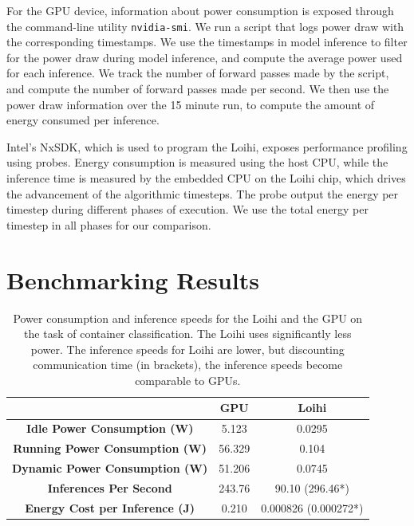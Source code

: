 \documentclass[fyp]{socreport}
\begin{document}
For the GPU device, information about power consumption is exposed through the
command-line utility \texttt{nvidia-smi}. We run a script that logs power draw
with the corresponding timestamps. We use the timestamps in model inference to
filter for the power draw during model inference, and compute the average power
used for each inference. We track the number of forward passes made by the
script, and compute the number of forward passes made per second. We then use
the power draw information over the 15 minute run, to compute the amount of
energy consumed per inference.

Intel's NxSDK, which is used to program the Loihi, exposes performance profiling
using probes. Energy consumption is measured using the host CPU, while the
inference time is measured by the embedded CPU on the Loihi chip, which drives
the advancement of the algorithmic timesteps. The probe output the energy per
timestep during different phases of execution. We use the total energy per
timestep in all phases for our comparison.

\section{Benchmarking Results}

\begin{table}
  \centering
  \begin{tabular}{c|c|c}
    \hline
    \hline
    & \textbf{GPU} & \textbf{Loihi} \\
    \hline
    \textbf{Idle Power Consumption (W)} & 5.123 & 0.0295 \\
    \textbf{Running Power Consumption (W)} & 56.329 & 0.104 \\
    \textbf{Dynamic Power Consumption (W)} & 51.206 & 0.0745 \\
    \textbf{Inferences Per Second} & 243.76 & 90.10 (296.46*) \\
    \textbf{Energy Cost per Inference (J)} & 0.210 & 0.000826 (0.000272*) \\
    \hline
    \hline
  \end{tabular}
  \caption{Power consumption and inference speeds for the Loihi and the GPU on
    the task of container classification. The Loihi uses significantly less
    power. The inference speeds for Loihi are lower, but discounting
    communication time (in brackets), the inference speeds become comparable to
    GPUs.}
  \label{tab:bench}
\end{table}
\end{document}

